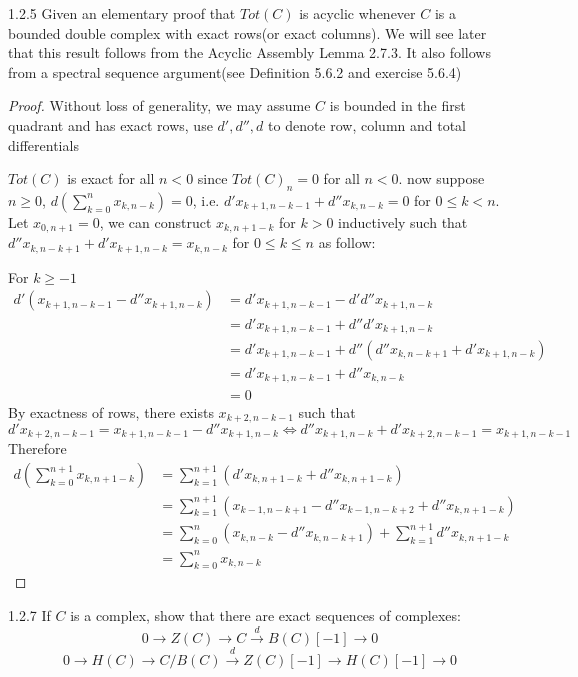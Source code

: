 \documentclass[../main.tex]{subfiles}
\begin{document}
\begin{customexercise}{1.2.5}
Given an elementary proof that $Tot(C)$ is acyclic whenever $C$ is a bounded double complex with exact rows(or exact columns). We will see later that this result follows from the Acyclic Assembly Lemma 2.7.3. It also follows from a spectral sequence argument(see Definition 5.6.2 and exercise 5.6.4)
\end{customexercise}

\begin{proof}
Without loss of generality, we may assume $C$ is bounded in the first quadrant and has exact rows, use $d',d'',d$ to denote row, column and total differentials \par
$Tot(C)$ is exact for all $n<0$ since $Tot(C)_n=0$ for all $n<0$. now suppose $n\geq 0$, $\displaystyle d\left(\sum_{k=0}^n x_{k,n-k}\right)=0$, i.e. $d'x_{k+1,n-k-1}+d''x_{k,n-k}=0$ for $0\leq k<n$. Let $x_{0,n+1}=0$, we can construct $x_{k,n+1-k}$ for $k>0$ inductively such that $d''x_{k,n-k+1}+d'x_{k+1,n-k}=x_{k,n-k}$ for $0\leq k\leq n$ as follow: \par
For $k\geq -1$
\begin{align*}
d'(x_{k+1,n-k-1}-d''x_{k+1,n-k})&=d'x_{k+1,n-k-1}-d'd''x_{k+1,n-k} \\
&=d'x_{k+1,n-k-1}+d''d'x_{k+1,n-k} \\
&=d'x_{k+1,n-k-1}+d''(d''x_{k,n-k+1}+d'x_{k+1,n-k}) \\
&=d'x_{k+1,n-k-1}+d''x_{k,n-k} \\
&=0
\end{align*}
By exactness of rows, there exists $x_{k+2,n-k-1}$ such that
\[d'x_{k+2,n-k-1}=x_{k+1,n-k-1}-d''x_{k+1,n-k}\Leftrightarrow d''x_{k+1,n-k}+d'x_{k+2,n-k-1}=x_{k+1,n-k-1}\]
Therefore
\begin{align*}
d\left(\sum_{k=0}^{n+1} x_{k,n+1-k}\right)&=\sum_{k=1}^{n+1} (d'x_{k,n+1-k}+d''x_{k,n+1-k}) \\
&=\sum_{k=1}^{n+1} (x_{k-1,n-k+1}-d''x_{k-1,n-k+2}+d''x_{k,n+1-k}) \\
&=\sum_{k=0}^{n} (x_{k,n-k}-d''x_{k,n-k+1})+\sum_{k=1}^{n+1}d''x_{k,n+1-k} \\
&=\sum_{k=0}^{n} x_{k,n-k}
\end{align*}
\end{proof}

\begin{customexercise}{1.2.7}
If $C$ is a complex, show that there are exact sequences of complexes:
\[0\to Z(C)\to C\xrightarrow{d}B(C)[-1]\to0\]
\[0\to H(C)\to C/B(C)\xrightarrow{d}Z(C)[-1]\to H(C)[-1]\to0\]
\end{customexercise}
\end{document}
